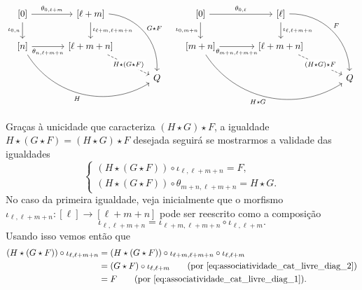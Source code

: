 \begin{equation}\label{eq:associatividade_cat_livre_diag_2}
    \begin{tikzcd}[column sep=1.25cm]
        {[0]}
        \arrow[r, "{\theta_{0,\ell+m}}"]
        \arrow[d, "{\iota_{0,n}}" swap]
        & {[\ell+m]}
        \arrow[d, "{\iota_{\ell+m,\ell+m+n}}"]
        \arrow[rdd, bend left=45, "G \star F"]
        \\ {[n]}
        \arrow[r, "{\theta_{n,\ell+m+n}}" swap]
        \arrow[rrd, bend right=45, "H" swap]
        & {[\ell+m+n]}
        \arrow[rd, dashed, "H \star (G \star F)" description]
        \\ & & Q
    \end{tikzcd}
    \quad
    \begin{tikzcd}[column sep=1.35cm]
        {[0]}
        \arrow[r, "{\theta_{0,\ell}}"]
        \arrow[d, "{\iota_{0,m+n}}" swap]
        & {[\ell]}
        \arrow[d, "{\iota_{\ell,\ell+m+n}}"]
        \arrow[rdd, bend left=45, "F"]
        \\ {[m+n]}
        \arrow[r, "{\theta_{m+n,\ell+m+n}}" swap]
        \arrow[rrd, bend right=45, "H \star G" swap]
        & {[\ell+m+n]}
        \arrow[rd, dashed, "(H \star G) \star F" description]
        \\ & & Q
    \end{tikzcd}
\end{equation}
Graças à unicidade que caracteriza $(H \star G) \star F$, a igualdade $H \star (G \star F) = (H \star G) \star F$ desejada seguirá se mostrarmos a validade das igualdades
\begin{displaymath}
    \begin{cases}
        (H \star (G \star F)) \circ \iota_{\ell,\ell+m+n} = F, \\
        (H \star (G \star F)) \circ \theta_{m+n,\ell+m+n} = H \star G.
    \end{cases}
\end{displaymath}
No caso da primeira igualdade, veja inicialmente que o morfismo $\iota_{\ell,\ell+m+n}: [\ell] \to [\ell+m+n]$ pode ser reescrito como a composição
\begin{displaymath}
    \iota_{\ell,\ell+m+n} = \iota_{\ell+m,\ell+m+n} \circ \iota_{\ell,\ell+m}.
\end{displaymath}
Usando isso vemos então que
\begin{align*}
    (H \star (G \star F)) \circ \iota_{\ell,\ell+m+n}
    & = (H \star (G \star F)) \circ \iota_{\ell+m,\ell+m+n} \circ \iota_{\ell,\ell+m} \\
    & = (G \star F) \circ \iota_{\ell,\ell+m}
    \tag{por \eqref{eq:associatividade_cat_livre_diag_2}} \\
    & = F
    \tag{por \eqref{eq:associatividade_cat_livre_diag_1}}.
\end{align*}
